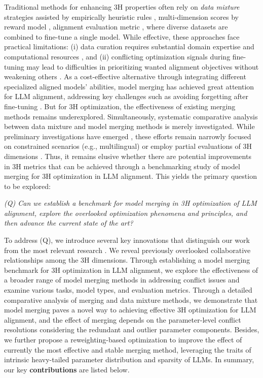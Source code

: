 Traditional methods for enhancing 3H properties often rely on \textit{data mixture} strategies assisted by empirically heuristic rules \cite{lambert2024t}, multi-dimension scores by reward model \cite{wang2024interpretable}, alignment evaluation metric \cite{jiang2024hummer}, where diverse datasets are combined to fine-tune a single model. While effective, these approaches face practical limitations: (i) data curation requires substantial domain expertise and computational resources \cite{ji2024pku}, and (ii) conflicting optimization signals during fine-tuning may lead to difficulties
in prioritizing wanted alignment objectives without weakening others \cite{jiang2024hummer}. As a cost-effective alternative through integrating different specialized aligned models' abilities, model merging has achieved great attention for LLM alignment, addressing key challenges such as avoiding forgetting after fine-tuning \cite{yang2024model,zhu2024model}. But for 3H optimization, the effectiveness of existing merging methods remains underexplored. Simultaneously, systematic comparative analysis between data mixture and model merging methods is merely investigated. While preliminary investigations have emerged \cite{ahmadian2024mix}, these efforts remain narrowly focused on constrained scenarios (e.g., multilingual) or employ partial evaluations of 3H dimensions \cite{tekin2024h}. Thus, it remains elusive whether there are potential improvements in 3H metrics that can be achieved through a benchmarking study of model merging for 3H optimization in LLM alignment. This yields the primary question to be explored:
\begin{center}
\vspace*{-2mm}
\textit{(Q) Can we establish a benchmark for model merging in
3H optimization of LLM alignment, explore the overlooked optimization phenomena and
principles, and then advance the current state of the art?}
\vspace*{-2mm}
\end{center}
To address (Q), we introduce several key innovations that distinguish our work from the most relevant research  \cite{ahmadian2024mix}. We reveal previously overlooked collaborative relationships among the 3H dimensions.  Through establishing a model merging benchmark for 3H optimization in LLM alignment, we explore the effectiveness of a broader range of model merging methods in addressing conflict issues and examine various tasks, model types, and evaluation metrics. Through a detailed comparative analysis of merging and data mixture methods, we demonstrate that model merging paves a novel way to achieving effective 3H optimization for LLM alignment, and the effect of merging depends on the parameter-level conflict resolutions considering the redundant and outlier parameter components. Besides, we further propose a reweighting-based optimization to improve the effect of currently the most effective and stable merging method, leveraging the traits of intrinsic heavy-tailed parameter distribution and sparsity of LLMs. In summary, our key  \textbf{contributions} are listed below. 


